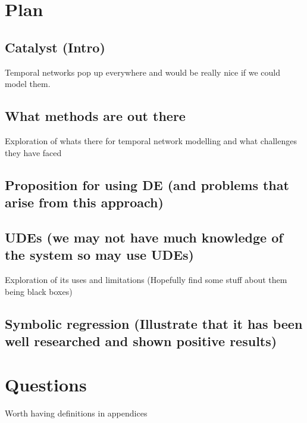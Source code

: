 \documentclass[12pt]{amsart}
\begin{document}
    
\section{Plan}
    \subsection{Catalyst (Intro)}
        Temporal networks pop up everywhere and would be really nice if we could model them.

    \subsection{What methods are out there}
        Exploration of whats there for temporal network modelling and what challenges they have faced
    
    \subsection{Proposition for using DE (and problems that arise from this approach)}

    \subsection{UDEs (we may not have much knowledge of the system so may use UDEs)}
        Exploration of its uses and limitations
        (Hopefully find some stuff about them being black boxes)

    \subsection{Symbolic regression (Illustrate that it has been well researched and shown positive results)}

\section{Questions}
    Worth having definitions in appendices
\end{document}

